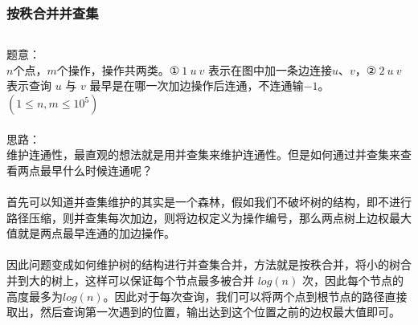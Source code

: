 \documentclass[twoside]{article}
\begin{document}
\subsubsection{按秩合并并查集}
\begin{lstlisting}
\end{lstlisting}
题意：\\
$n$个点，$m$个操作，操作共两类。$①\ 1\ u\  v$ 表示在图中加一条边连接$u、v$，$②\ 2\ u\ v$ 表示查询 $u$ 与 $v$ 最早是在哪一次加边操作后连通，不连通输$-1$。 $(1\leq n,m\leq 10^5)$\\
\\
思路：\\
维护连通性，最直观的想法就是用并查集来维护连通性。但是如何通过并查集来查看两点最早什么时候连通呢？\\
\\
首先可以知道并查集维护的其实是一个森林，假如我们不破坏树的结构，即不进行路径压缩，则并查集每次加边，则将边权定义为操作编号，那么两点树上边权最大值就是两点最早连通的加边操作。\\
\\
因此问题变成如何维护树的结构进行并查集合并，方法就是按秩合并，将小的树合并到大的树上，这样可以保证每个节点最多被合并 $log(n)$ 次，因此每个节点的高度最多为$log(n)$。因此对于每次查询，我们可以将两个点到根节点的路径直接取出，然后查询第一次遇到的位置，输出达到这个位置之前的边权最大值即可。\\
\end{document}
